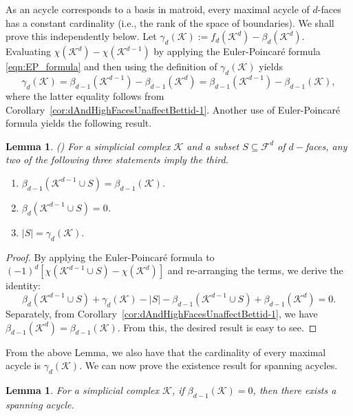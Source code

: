 \documentclass[12pt]{amsart}
\newcommand{\red}[1]{\textcolor{red}{#1}}
\newcommand{\dy}[1]{\textcolor{magenta}{#1}}
\newcommand{\gt}[1]{\textcolor{blue}{#1}}
\renewcommand{\red}[1]{#1}
\renewcommand{\dy}[1]{#1}
\renewcommand{\gt}[1]{#1}
\newtheorem{lemma}[theorem]{Lemma}
\numberwithin{equation}{section}
\numberwithin{theorem}{section}
\newcommand{\be}{\begin{equation}}
\newcommand{\ee}{\end{equation}}
\newcommand{\1}{\mathbf{1}}
\def\F{\mathcal{F}}
\def\K{\mathcal{K}}
\begin{document}
\red{As an acycle corresponds to a basis in matroid, every maximal acycle of $d$-faces has a constant cardinality (i.e., the rank of the space of boundaries). We shall prove this independently below.} \gt{Let $\gamma_d(\K) := f_d(\K^d) - \beta_d(\K^d)$.} \gt{Evaluating $\chi(\K^d) - \chi(\K^{d-1})$ by applying the   Euler-Poincar\'{e} formula \eqref{eqn:EP_formula} and then using the definition of $\gamma_d(\K)$ yields} 
%
\be \label{eq:useful_identity}
\gamma_d(\K)= \beta_{d-1}(\K^{d-1}) - \beta_{d-1}(\K^d) = \beta_{d-1}(\K^{d-1}) - \beta_{d-1}(\K),
\ee
where the latter equality follows from Corollary~\ref{cor:dAndHighFacesUnaffectBettid-1}.
%
Another use of Euler-Poincar\'{e} formula yields the following result.
%
\begin{lemma}(\cite[Proposition 2.13]{Duval16})
\label{lem:cardinality}
For a simplicial complex $\K$ and a subset $S \subseteq \F^d$ of $d-$faces, any two of the following three statements imply the third.
%
\begin{enumerate}
\item $ \beta_{d-1}(\K^{d-1} \cup S) = \beta_{d-1}(\K)$.
\item $\beta_{d}(\K^{d-1} \cup S) = 0$.
\item $|S| = \gamma_d(\K).$
\end{enumerate}
%
\end{lemma}
%
\begin{proof}
By applying the Euler-Poincar\'{e} formula to $(-1)^d[\chi(\K^{d-1} \cup S) - \chi(\K^d)] $ and re-arranging the terms, we derive the  identity:
%
\gt{\be
\label{eqn:RelBetBettiGamma}
\beta_d(\K^{d-1} \cup S) + \gamma_d(\K) - |S| - \beta_{d-1}(\K^{d-1} \cup S) + \beta_{d-1}(\K^d) = 0.
\ee}
%
\gt{ Separately, from Corollary~\ref{cor:dAndHighFacesUnaffectBettid-1}, we have $\beta_{d - 1}(\K^d) = \beta_{d - 1}(\K).$ From this, the desired result is easy to see.}
\end{proof}
%
\dy{From the above Lemma, we also have that the cardinality of every maximal acycle is $\gamma_d(\K)$. We can now prove the existence result} \gt{for spanning acycles}.  
%
\begin{lemma}
\label{lem:existence}
For a simplicial complex  $\K$, if $\beta_{d-1}(\K) = 0$, then  there exists a spanning acycle.
\end{lemma}
%
\end{document}
